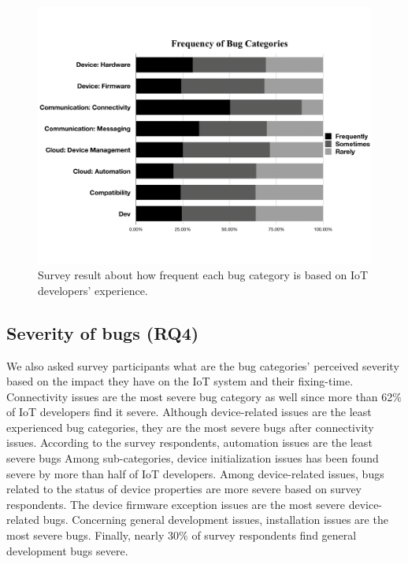 \begin{figure}%
  \centering
   \includegraphics[width=\linewidth]{imgs/bugFreq}
  \caption{Survey result about how frequent each bug category is based on IoT developers' experience.}
  \label{fig:bugFreq}
\end{figure}

\subsection{Severity of bugs (RQ4)}
We also asked survey participants what are the bug categories' perceived severity based on the impact they have on the IoT system and their fixing-time. Connectivity issues are the most severe bug category as well since more than 62\% of IoT developers find it severe. Although device-related issues are the least experienced bug categories, they are the most severe bugs after connectivity issues. According to the survey respondents, automation issues are the least severe bugs Among sub-categories, device initialization issues has been found severe by more than half of IoT developers. Among device-related issues, bugs related to the status of device properties are more severe based on survey respondents. The device firmware exception issues are the most severe device-related bugs. Concerning general development issues, installation issues are the most  severe bugs. Finally, nearly 30\% of survey respondents find general development bugs severe.


